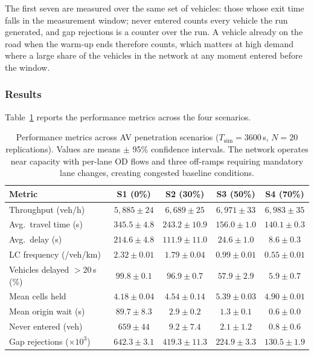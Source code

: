\documentclass[review,number]{elsarticle}
\begin{document}
The first seven are measured over the same set of vehicles: those whose exit time falls in the measurement window; never entered counts every vehicle the run generated, and gap rejections is a counter over the run. A vehicle already on the road when the warm-up ends therefore counts, which matters at high demand where a large share of the vehicles in the network at any moment entered before the window.

\subsubsection{Results}

Table~\ref{tab:results_mixed} reports the performance metrics across the four scenarios.

\begin{table}[ht]
\centering
\caption{Performance metrics across AV penetration scenarios ($T_{\text{sim}} = 3600$\,s, $N = 20$ replications). Values are means $\pm$ 95\% confidence intervals. The network operates near capacity with per-lane OD flows and three off-ramps requiring mandatory lane changes, creating congested baseline conditions.}
\label{tab:results_mixed}
\begin{tabular}{@{}lcccc@{}}
\toprule
Metric & S1 (0\%) & S2 (30\%) & S3 (50\%) & S4 (70\%) \\
\midrule
Throughput (veh/h) & $5{,}885 \pm 24$ & $6{,}689 \pm 25$ & $6{,}971 \pm 33$ & $6{,}983 \pm 35$ \\
Avg.\ travel time (s) & $345.5 \pm 4.8$ & $243.2 \pm 10.9$ & $156.0 \pm 1.0$ & $140.1 \pm 0.3$ \\
Avg.\ delay (s) & $214.6 \pm 4.8$ & $111.9 \pm 11.0$ & $24.6 \pm 1.0$ & $8.6 \pm 0.3$ \\
LC frequency (/veh/km) & $2.32 \pm 0.01$ & $1.79 \pm 0.04$ & $0.99 \pm 0.01$ & $0.55 \pm 0.01$ \\
Vehicles delayed $>20$\,s (\%) & $99.8 \pm 0.1$ & $96.9 \pm 0.7$ & $57.9 \pm 2.9$ & $5.9 \pm 0.7$ \\
Mean cells held & $4.18 \pm 0.04$ & $4.54 \pm 0.14$ & $5.39 \pm 0.03$ & $4.90 \pm 0.01$ \\
Mean origin wait (s) & $89.7 \pm 8.3$ & $2.9 \pm 0.2$ & $1.3 \pm 0.1$ & $0.6 \pm 0.0$ \\
Never entered (veh) & $659 \pm 44$ & $9.2 \pm 7.4$ & $2.1 \pm 1.2$ & $0.8 \pm 0.6$ \\
Gap rejections ($\times 10^3$) & $642.3 \pm 3.1$ & $419.3 \pm 11.3$ & $224.9 \pm 3.3$ & $130.5 \pm 1.9$ \\
\bottomrule
\end{tabular}
\end{table}
\end{document}
